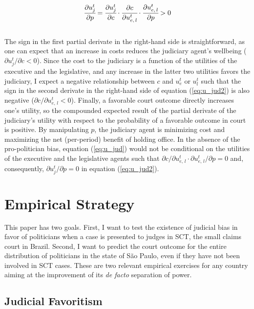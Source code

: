 \documentclass[11pt]{article}
\newcommand{\refp}[1]{(\ref{#1})}
\begin{document}
\begin{equation} \label{eq:u_jud2}
  \cfrac{\partial u_{j}^{t}}{\partial p} = \cfrac{\partial u_{j}^{t}}{\partial c} \cdot \cfrac{\partial c}{\partial u_{e, \, l}^{t}} \cdot \cfrac{\partial u_{e, \, l}^{t}}{\partial p} > 0
\end{equation} \\

The sign in the first partial derivate in the right-hand side is straightforward, as one can expect that an increase in costs reduces the judiciary agent's wellbeing ($\partial u_{j}^{t} / \partial c < 0$). Since the cost to the judiciary is a function of the utilities of the executive and the legislative, and any increase in the latter two utilities favors the judiciary, I expect a negative relationship between $c$ and $u_{e}^{t}$ or $u_{l}^{t}$ such that the sign in the second derivate in the right-hand side of equation \refp{eq:u_jud2} is also negative ($\partial c / \partial u_{e, \, l}^{t} < 0$). Finally, a favorable court outcome directly increases one's utility, so the compounded expected result of the partial derivate of the judiciary's utility with respect to the probability of a favorable outcome in court is positive. By manipulating $p$, the judiciary agent is minimizing cost and maximizing the net (per-period) benefit of holding office. In the absence of the pro-politician bias, equation \refp{eq:u_jud} would not be conditional on the utilities of the executive and the legislative agents such that $\partial c / \partial u_{e, \, l}^{t} \cdot \partial u_{e, \, l}^{t} / \partial p = 0$ and, consequently, $\partial u_{j}^{t} / \partial p = 0$ in equation \refp{eq:u_jud2}.

\section{Empirical Strategy} \label{sec:methods_paper2}

This paper has two goals. First, I want to test the existence of judicial bias in favor of politicians when a case is presented to judges in SCT, the small claims court in Brazil. Second, I want to predict the court outcome for the entire distribution of politicians in the state of São Paulo, even if they have not been involved in SCT cases. These are two relevant empirical exercises for any country aiming at the improvement of its \emph{de facto} separation of power.

\subsection{Judicial Favoritism} \label{subsec:methods1_paper2}
\end{document}
